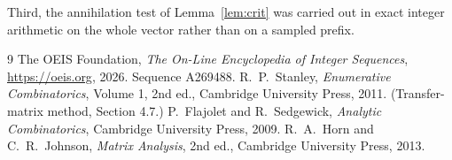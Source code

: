 \documentclass[11pt,a4paper]{article}
\theoremstyle{plain}
\theoremstyle{definition}
\begin{document}
Third, the annihilation test of Lemma~\ref{lem:crit} was carried out in exact integer
arithmetic on the whole vector rather than on a sampled prefix.

\begin{thebibliography}{9}
 The OEIS Foundation, \emph{The On-Line Encyclopedia of Integer
Sequences}, \url{https://oeis.org}, 2026. Sequence A269488.
 R.~P.~Stanley, \emph{Enumerative Combinatorics}, Volume 1, 2nd ed.,
Cambridge University Press, 2011. (Transfer-matrix method, Section 4.7.)
 P.~Flajolet and R.~Sedgewick, \emph{Analytic Combinatorics}, Cambridge
University Press, 2009.
 R.~A.~Horn and C.~R.~Johnson, \emph{Matrix Analysis}, 2nd ed., Cambridge
University Press, 2013.
\end{thebibliography}
\end{document}
